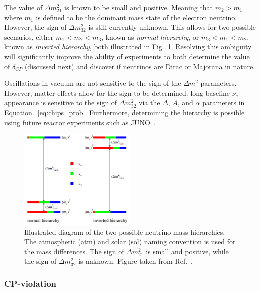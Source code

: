 The value of $\Delta m_{21}^2$ is known to be small and positive. Meaning that $m_{2}>m_{1}$ where
$m_{1}$ is defined to be the dominant mass state of the electron neutrino. However, the sign of
$\Delta m_{32}^2$ is still currently unknown. This allows for two possible scenarios, either
$m_1<m_2<m_3$, known as \emph{normal hierarchy}, or $m_3<m_1<m_2$, known as \emph{inverted
    hierarchy}, both illustrated in Fig.~\ref{fig:hierarchy}. Resolving this ambiguity will
significantly improve the ability of experiments to both determine the value of $\delta_{CP}$
(discussed next) and discover if neutrinos are Dirac or Majorana in nature.

Oscillations in vacuum are not sensitive to the sign of the $\Delta m^{2}$ parameters. However,
matter effects allow for the sign to be determined. long-baseline $\nu_{e}$ appearance is
sensitive to the sign of $\Delta m_{32}^2$ via the $\Delta$, $A$, and $\alpha$ parameters in
Equation.~\ref{eq:chips_prob}. Furthermore, determining the hierarchy is possible using future
reactor experiments such as JUNO~\cite{an2016}.

\begin{figure} %
    \includegraphics[origin=c,width=0.5\textwidth]{diagrams/3-theory/hierarchy.png}
    \caption[Illustration of the two possible neutrino mass hierarchies]
    {Illustrated diagram of the two possible neutrino mass hierarchies. The atmospheric (atm) and
        solar (sol) naming convention is used for the mass differences. The sign of $\Delta
            m_{21}^{2}$ is small and positive, while the sign of $\Delta m_{32}^{2}$ is unknown.
        Figure taken from Ref.~\cite{gouvea2013}.}
    \label{fig:hierarchy}
\end{figure}

\subsubsection*{CP-violation} %

